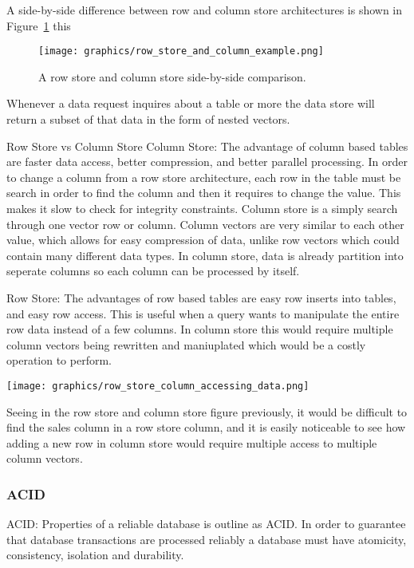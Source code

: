 \documentclass[letterpaper, 12pt]{article}
\begin{document}
A side-by-side difference between row and column store architectures is shown in Figure~\ref{fig:row_column_diff}
this 
\par\vspace{\baselineskip}
\begin{figure}
  \centering
  \texttt{[image: graphics/row\_store\_and\_column\_example.png]}
   \cite{rowstorefigure}
  \label{fig:row_column_diff}
  \caption{A row store and column store side-by-side comparison.}
\end{figure}

Whenever a data request inquires about a table or more the data store will return a subset of that
data in the form of nested vectors.

Row Store vs Column Store
Column Store:
The advantage of column based tables are faster data access, better compression, and better parallel processing.
In order to change a column from a row store architecture, each row in the table must be search in order to find the
column and then it requires to change the value. This makes it slow to check for integrity constraints. Column store
is a simply search through one vector row or column. Column vectors are very similar to each other value, which allows
for easy compression of data, unlike row vectors which could contain many different data types. In column store, data
is already partition into seperate columns so each column can be processed by itself.

Row Store:
The advantages of row based tables are easy row inserts into tables, and easy row access. This is useful when a query
wants to manipulate the entire row data instead of a few columns. In column store this would require multiple column vectors
being rewritten and maniuplated which would be a costly operation to perform.

\texttt{[image: graphics/row\_store\_column\_accessing\_data.png]}
\cite{rowstorefigure}

Seeing in the row store and column store figure previously, it would be
difficult to find the sales column in a row store column, and it is easily
noticeable to see how adding a new row in column store would require multiple
access to multiple column vectors.

\subsubsection{ACID}

ACID:
Properties of a reliable database is outline as ACID. In order to guarantee that
database transactions are processed reliably a database must have atomicity, consistency,
isolation and durability.
\end{document}

